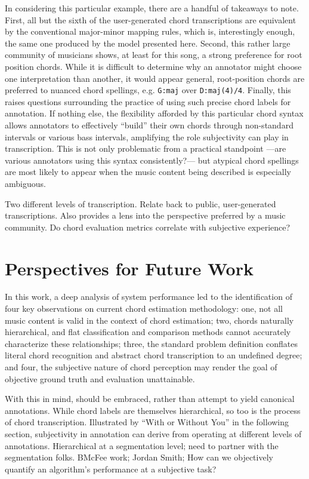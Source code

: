 \documentclass{article}
\begin{document}
In considering this particular example, there are a handful of takeaways to note.
First, all but the sixth of the user-generated chord transcriptions are equivalent by the conventional major-minor mapping rules, which is, interestingly enough, the same one produced by the model presented here.
Second, this rather large community of musicians shows, at least for this song, a strong preference for root position chords.
While it is difficult to determine why an annotator might choose one interpretation than another, it would appear general, root-position chords are preferred to nuanced chord spellings, e.g. \texttt{G:maj} over \texttt{D:maj(4)/4}.
Finally, this raises questions surrounding the practice of using such precise chord labels for annotation.
If nothing else, the flexibility afforded by this particular chord syntax allows annotators to effectively ``build'' their own chords through non-standard intervals or various bass intervals, amplifying the role subjectivity can play in transcription.
This is not only problematic from a practical standpoint ---are various annotators using this syntax consistently?--- but atypical chord spellings are most likely to appear when the music content being described is especially ambiguous.

Two different levels of transcription.
Relate back to public, user-generated transcriptions.
Also provides a lens into the perspective preferred by a music community.
Do chord evaluation metrics correlate with subjective experience?


\section{Perspectives for Future Work}
\label{sec:perspectives}

In this work, a deep analysis of system performance led to the identification of four key observations on current chord estimation methodology:
one, not all music content is valid in the context of chord estimation;
two, chords naturally hierarchical, and flat classification and comparison methods cannot accurately characterize these relationships;
three, the standard problem definition conflates literal chord recognition and abstract chord transcription to an undefined degree;
and four, the subjective nature of chord perception may render the goal of objective ground truth and evaluation unattainable.

With this in mind,
should be embraced, rather than attempt to yield canonical annotations.
While chord labels are themselves hierarchical, so too is the process of chord transcription.
Illustrated by ``With or Without You'' in the following section, subjectivity in annotation can derive from operating at different levels of annotations.
Hierarchical at a segmentation level; need to partner with the segmentation folks.
BMcFee work; Jordan Smith;
How can we objectively quantify an algorithm's performance at a subjective task?




\end{document}
